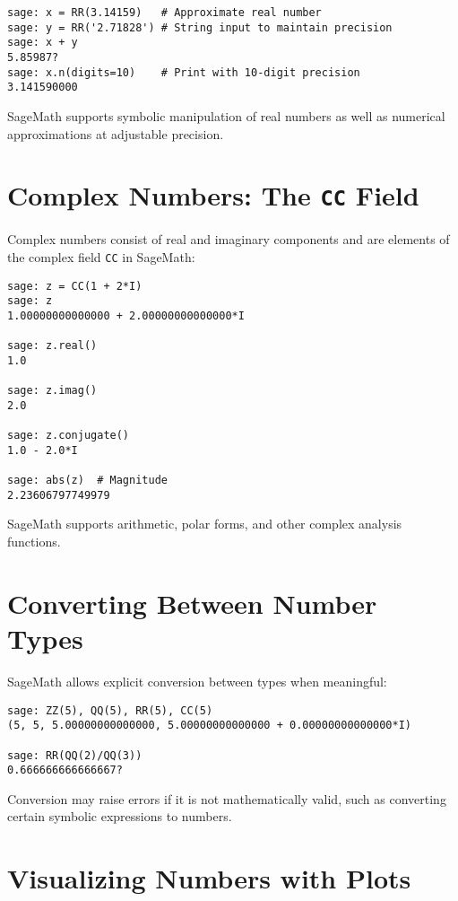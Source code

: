 \documentclass[12pt]{book}
\begin{document}
\begin{verbatim}
sage: x = RR(3.14159)   # Approximate real number
sage: y = RR('2.71828') # String input to maintain precision
sage: x + y
5.85987?
sage: x.n(digits=10)    # Print with 10-digit precision
3.141590000
\end{verbatim}

SageMath supports symbolic manipulation of real numbers as well as numerical approximations at adjustable precision.

\section{Complex Numbers: The \texttt{CC} Field}

Complex numbers consist of real and imaginary components and are elements of the complex field \texttt{CC} in SageMath:

\begin{verbatim}
sage: z = CC(1 + 2*I)
sage: z
1.00000000000000 + 2.00000000000000*I

sage: z.real()
1.0

sage: z.imag()
2.0

sage: z.conjugate()
1.0 - 2.0*I

sage: abs(z)  # Magnitude
2.23606797749979
\end{verbatim}

SageMath supports arithmetic, polar forms, and other complex analysis functions.

\section{Converting Between Number Types}

SageMath allows explicit conversion between types when meaningful:

\begin{verbatim}
sage: ZZ(5), QQ(5), RR(5), CC(5)
(5, 5, 5.00000000000000, 5.00000000000000 + 0.00000000000000*I)

sage: RR(QQ(2)/QQ(3))
0.666666666666667?
\end{verbatim}

Conversion may raise errors if it is not mathematically valid, such as converting certain symbolic expressions to numbers.

\section{Visualizing Numbers with Plots}
\end{document}
